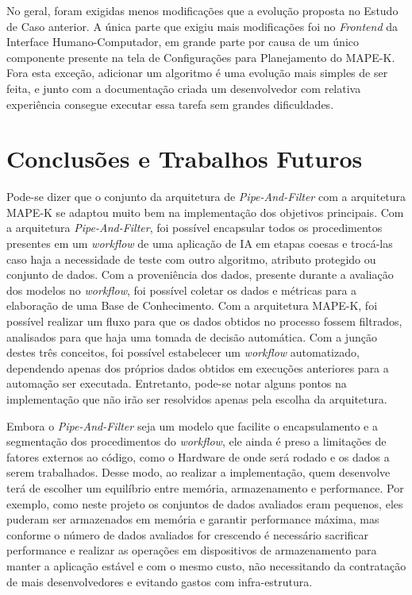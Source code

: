 \documentclass[twocolumn]{article}
\begin{document}
No geral, foram exigidas menos modificações que a evolução proposta no Estudo de Caso anterior. A única parte que exigiu mais modificações foi no \textit{Frontend} da Interface Humano-Computador, em grande parte por causa de um único componente presente na tela de Configurações para Planejamento do MAPE-K. Fora esta exceção, adicionar um algoritmo é uma evolução mais simples de ser feita, e junto com a documentação criada um desenvolvedor com relativa experiência consegue executar essa tarefa sem grandes dificuldades.

\section{Conclusões e Trabalhos Futuros}

Pode-se dizer que o conjunto da arquitetura de \textit{Pipe-And-Filter} com a arquitetura MAPE-K se adaptou muito bem na implementação dos objetivos principais. Com a arquitetura \textit{Pipe-And-Filter}, foi possível encapsular todos os procedimentos presentes em um \textit{workflow} de uma aplicação de IA em etapas coesas e trocá-las caso haja a necessidade de teste com outro algoritmo, atributo protegido ou conjunto de dados. Com a proveniência dos dados, presente durante a avaliação dos modelos no \textit{workflow}, foi possível coletar os dados e métricas para a elaboração de uma Base de Conhecimento. Com a arquitetura MAPE-K, foi possível realizar um fluxo para que os dados obtidos no processo fossem filtrados, analisados para que haja uma tomada de decisão automática. Com a junção destes três conceitos, foi possível estabelecer um \textit{workflow} automatizado, dependendo apenas dos próprios dados obtidos em execuções anteriores para a automação ser executada. Entretanto, pode-se notar alguns pontos na implementação que não irão ser resolvidos apenas pela escolha da arquitetura.

Embora o \textit{Pipe-And-Filter} seja um modelo que facilite o encapsulamento e a segmentação dos procedimentos do \textit{workflow}, ele ainda é preso a limitações de fatores externos ao código, como o Hardware de onde será rodado e os dados a serem trabalhados. Desse modo, ao realizar a implementação, quem desenvolve terá de escolher um equilíbrio entre memória, armazenamento e performance. Por exemplo, como neste projeto os conjuntos de dados avaliados eram pequenos, eles puderam ser armazenados em memória e garantir performance máxima, mas conforme o número de dados avaliados for crescendo é necessário sacrificar performance e realizar as operações em dispositivos de armazenamento para manter a aplicação estável e com o mesmo custo, não necessitando da contratação de mais desenvolvedores e evitando gastos com infra-estrutura.
\end{document}
